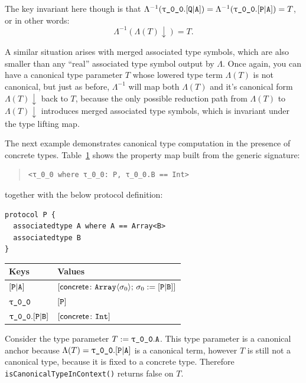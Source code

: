 \documentclass[../generics]{subfiles}
\begin{document}
\begin{example}
The key invariant here though is that $\Lambda^{-1}(\rT.\assocsym{Q}{A})=\Lambda^{-1}(\rT.\assocsym{P}{A})=T$, or in other words:
\[\Lambda^{-1}(\Lambda(T){\downarrow})=T.\]

A similar situation arises with merged associated type symbols, which are also smaller than any ``real'' associated type symbol output by $\Lambda$. Once again, you can have a canonical type parameter $T$ whose lowered type term $\Lambda(T)$ is not canonical, but just as before, $\Lambda^{-1}$ will map both $\Lambda(T)$ and it's canonical form $\Lambda(T){\downarrow}$ back to $T$, because the only possible reduction path from $\Lambda(T)$ to $\Lambda(T){\downarrow}$ introduces merged associated type symbols, which is invariant under the type lifting map.
\end{example}
\begin{example} \label{concretecanonicalpropertymapex}
The next example demonstrates canonical type computation in the presence of concrete types. Table~\ref{concretecanonicalpropertymap} shows the property map built from the generic signature:
\begin{quote}
\begin{verbatim}
<τ_0_0 where τ_0_0: P, τ_0_0.B == Int>
\end{verbatim}
\end{quote}
together with the below protocol definition:
\begin{Verbatim}
protocol P {
  associatedtype A where A == Array<B>
  associatedtype B
}
\end{Verbatim}
\begin{table}\label{concretecanonicalpropertymap}
\begin{center}
\begin{tabular}{|l|l|}
\hline
Keys&Values\\
\hline
\hline
$[\texttt{P}|\texttt{A}]$&$[\mathsf{concrete}\colon \texttt{Array}\langle\sigma_0\rangle;\,\sigma_0:=[\texttt{P}|\texttt{B}]]$\\
$\rT$&$[\texttt{P}]$\\
$\rT.\assocsym{P}{B}$&$[\mathsf{concrete}\colon \texttt{Int}]$\\
\hline
\end{tabular}
\end{center}
\end{table}

Consider the type parameter $T:=\rT.\nA$. This type parameter is a canonical anchor because $\Lambda(T)=\rT.\assocsym{P}{A}$ is a canonical term, however $T$ is still not a canonical type, because it is fixed to a concrete type. Therefore \texttt{isCanonicalTypeInContext()} returns false on $T$.


\end{example}
\end{document}
